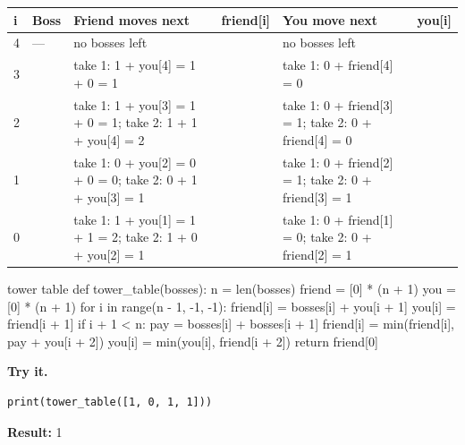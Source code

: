 \documentclass[11pt,a4paper,oneside]{report}
\begin{document}
\par\medskip\begingroup\small\setlength{\tabcolsep}{4pt}\renewcommand{\arraystretch}{1.3}\begin{tabularx}{\linewidth}{>{\raggedright\arraybackslash}p{5mm}>{\raggedright\arraybackslash}p{9mm}>{\raggedright\arraybackslash}X>{\raggedright\arraybackslash}p{14mm}>{\raggedright\arraybackslash}X>{\raggedright\arraybackslash}p{12mm}}\toprule\textbf{i} & \textbf{Boss} & \textbf{Friend moves next} & \textbf{friend[i]} & \textbf{You move next} & \textbf{you[i]}\\\midrule
{}4 & — & no bosses left & 0 & no bosses left & 0\\
{}3 & 1 & take 1: 1 + you[4] = 1 + 0 = 1 & 1 & take 1: 0 + friend[4] = 0 & 0\\
{}2 & 1 & take 1: 1 + you[3] = 1 + 0 = 1;  take 2: 1 + 1 + you[4] = 2 & 1 & take 1: 0 + friend[3] = 1;  take 2: 0 + friend[4] = 0 & 0\\
{}1 & 0 & take 1: 0 + you[2] = 0 + 0 = 0;  take 2: 0 + 1 + you[3] = 1 & 0 & take 1: 0 + friend[2] = 1;  take 2: 0 + friend[3] = 1 & 1\\
{}0 & 1 & take 1: 1 + you[1] = 1 + 1 = 2;  take 2: 1 + 0 + you[2] = 1 & 1 & take 1: 0 + friend[1] = 0;  take 2: 0 + friend[2] = 1 & 0\\
\bottomrule\end{tabularx}\endgroup\par\medskip
{}
\begin{bookcode}{tower table}
def tower_table(bosses):
    n = len(bosses)
    friend = [0] * (n + 1)
    you = [0] * (n + 1)
    for i in range(n - 1, -1, -1):
        friend[i] = bosses[i] + you[i + 1]
        you[i] = friend[i + 1]
        if i + 1 < n:
            pay = bosses[i] + bosses[i + 1]
            friend[i] = min(friend[i], pay + you[i + 2])
            you[i] = min(you[i], friend[i + 2])
    return friend[0]
\end{bookcode}
\textbf{Try it.}

\begin{lstlisting}
print(tower_table([1, 0, 1, 1]))
\end{lstlisting}
\textbf{Result:} 1
\end{document}
